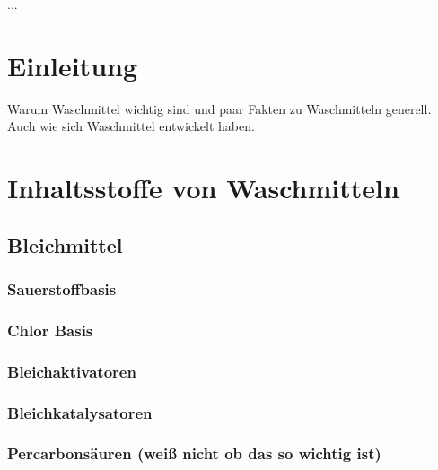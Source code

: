 \documentclass[12pt, ngerman]{article}
\begin{document}

\newcommand{\VWAtitel}{"`Nicht nur sauber, sondern rein"' - Waschmittel und ihre Inhaltsstoffe}
\newcommand{\VWAauthor}{Hofmann Michael}
\newcommand{\klasse}{8C}
\newcommand{\jahr}{2022/23}
\newcommand{\betreuungslehrperson}{Mag. Barbara Hirss}
\newcommand{\vorlagedatum}{tt.mm.jjjj}


\setcounter{page}{2}

\abstract
...
\tableofcontents
\clearpage
{}

\section{Einleitung}
Warum Waschmittel wichtig sind und paar Fakten zu Waschmitteln generell. Auch wie sich Waschmittel entwickelt haben.

\section{Inhaltsstoffe von Waschmitteln}



\subsection{Bleichmittel}

\subsubsection{Sauerstoffbasis}

\subsubsection{Chlor Basis}

\subsubsection{Bleichaktivatoren}

\subsubsection{Bleichkatalysatoren}

\subsubsection{Percarbonsäuren (weiß nicht ob das so wichtig ist)}
\end{document}
